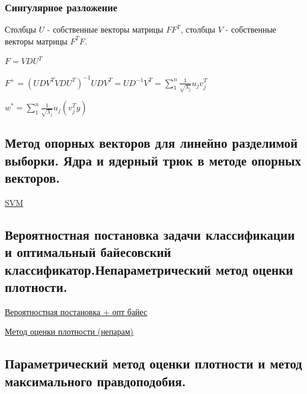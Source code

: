 \documentclass{article}
\begin{document}
\subsubsection{Сингулярное разложение}


Столбцы $U$ - собственные векторы матрицы $F F^T$, столбцы $V$ - собственные
векторы матрицы $F^T F$.

$F = VDU^T$

$F^+ = (U D V^T V D U^T)^{-1} U D V^T = U D^{-1} V^T = \sum\limits_1^n
\frac{1}{\sqrt{\lambda_j}} u_j v_j^T$

$w^* = \sum\limits_1^n \frac{1}{\sqrt{\lambda_j}} u_j (v_j^T y)$


\subsection{Метод опорных векторов для линейно разделимой выборки. Ядра и ядерный
трюк в методе опорных векторов.}

\href{https://neerc.ifmo.ru/wiki/index.php?title=%D0%9C%D0%B5%D1%82%D0%BE%D0%B4_%D0%BE%D0%BF%D0%BE%D1%80%D0%BD%D1%8B%D1%85_%D0%B2%D0%B5%D0%BA%D1%82%D0%BE%D1%80%D0%BE%D0%B2_(SVM)}{SVM}


\subsection{Вероятностная постановка задачи классификации и оптимальный
байесовский классификатор.Непараметрический метод оценки плотности.}

\href{
	https://neerc.ifmo.ru/wiki/index.php?title=%
}{Вероятностная постановка + опт байес}

\href{
	http://www.machinelearning.ru/wiki/index.php?title=%
}{
	Метод оценки плотности (непарам)
}


\subsection{Параметрический метод оценки плотности и метод максимального
правдоподобия.}
\end{document}
